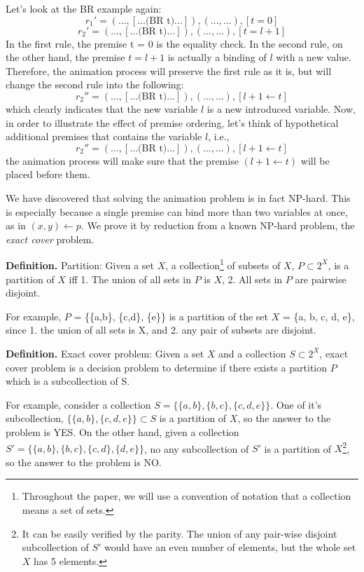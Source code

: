 Let's look at the BR example again:
\[
r_1' = (..., [... \text{(BR t)} ...]),  (..., ...), [t = 0]
\]
\[
r_2' = (..., [... \text{(BR t)} ...]),  (..., ...), [t = l + 1]
\]
In the first rule, the premise t = 0 is the equality check.
In the second rule, on the other hand, the premise $t = l+1$ is actually a binding of $l$ with a new value.
Therefore, the animation process will preserve the first rule as it is, but will change the
second rule into the following:
\[
r_2'' = (..., [... \text{(BR t)} ...]),  (..., ...), [l + 1 \leftarrow t]
\]
which clearly indicates that the new variable $l$ is a new introduced variable.
Now, in order to illustrate the effect of premise ordering, let's think of 
hypothetical additional premises that contains the variable $l$, i.e.,
\[
r_2'' = (..., [... \text{(BR t)} ...]),  (..., ...), [l + 1 \leftarrow t]
\]
the animation process will make sure that the premise $(l + 1 \leftarrow t)$ will be
placed before them.

We have discovered that solving the animation problem is in fact NP-hard.
This is especially because a single premise can bind more than two variables at once, as in
$(x,y) \leftarrow p$.
We prove it by reduction from a known NP-hard problem, the \textit{exact cover} problem.

\textbf{Definition.} Partition: Given a set $X$, a collection\footnote{Throughout the paper, we will
use a convention of notation that a collection means a set of sets.}
of subsets of $X$, $P \subset 2^X$, is a partition of $X$ iff
1. The union of all sets in $P$ is $X$,
2. All sets in $P$ are pairwise disjoint.

For example, $P$ = \{\{a,b\}, \{c,d\}, \{e\}\} is a partition of the set $X$ = \{a, b, c, d, e\},
since 1. the union of all sets is X, and 2. any pair of subsets are disjoint.

\textbf{Definition.} Exact cover problem: Given a set $X$ and a collection $S \subset 2^X$,
exact cover problem is a decision problem to determine if there exists a partition $P$ which is a
subcollection of S.

For example, consider a collection $S = \{\{a,b\}, \{b,c\}, \{c,d,e\}\}$.
One of it's subcollection, $\{\{a,b\}, \{c,d,e\}\} \subset S$ is a partition of $X$,
so the answer to the problem is YES.
On the other hand, given a collection $S' = \{\{a,b\}, \{b,c\}, \{c,d\}, \{d,e\}\}$,
no any subcollection of $S'$ is a partition of $X$\footnote{It can be easily
verified by the parity. The union of any pair-wise disjoint subcollection of $S'$ would have an even number
of elements, but the whole set $X$ has 5 elements.}, so the answer to the problem is
NO.

